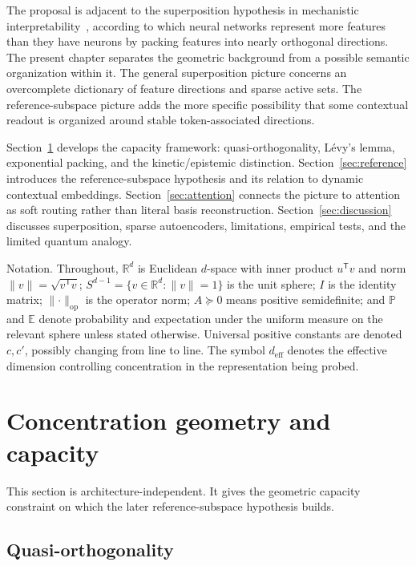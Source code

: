 \documentclass[
  aps,
  reprint,
  superscriptaddress,
  floatfix,
  nofootinbib,
  longbibliography
]{revtex4-2}
\newcommand{\R}{\mathbb{R}}
\newcommand{\E}{\mathbb{E}}
\newcommand{\Prob}{\mathbb{P}}
\newcommand{\Sph}[1]{S^{#1}}
\newcommand{\deff}{d_{\mathrm{eff}}}
\newcommand{\T}{^{\mathsf{T}}}
\newcommand{\opnorm}[1]{\lVert #1 \rVert_{\mathrm{op}}}
\newcommand{\norm}[1]{\lVert #1 \rVert}
\begin{document}
The proposal is adjacent to the superposition hypothesis in mechanistic
interpretability~\cite{elhage2022superposition}, according to which neural networks
represent more features than they have neurons by packing features into
nearly orthogonal directions. The present chapter separates the
geometric background from a possible semantic organization within it.
The general superposition picture concerns an overcomplete dictionary
of feature directions and sparse active sets. The reference-subspace picture adds
the more specific possibility that some contextual readout is organized
around stable token-associated directions.

Section~\ref{sec:concentration} develops the capacity framework:
quasi-orthogonality, L\'evy's lemma, exponential packing, and the
kinetic/epistemic distinction. Section~\ref{sec:reference} introduces the
reference-subspace hypothesis and its relation to dynamic contextual
embeddings. Section~\ref{sec:attention} connects the picture to
attention as soft routing rather than literal basis reconstruction.
Section~\ref{sec:discussion} discusses superposition, sparse
autoencoders, limitations, empirical tests, and the limited quantum
analogy.

{Notation.}
Throughout, $\R^{d}$ is Euclidean $d$-space with inner product $u\T v$
and norm $\norm{v}=\sqrt{v\T v}$; $\Sph{d-1}=\{v\in\R^{d}:\norm{v}=1\}$
is the unit sphere; $I$ is the identity matrix; $\opnorm{\cdot}$ is the
operator norm; $A\succeq0$ means positive semidefinite; and $\Prob$ and
$\E$ denote probability and expectation under the uniform measure on
the relevant sphere unless stated otherwise. Universal positive
constants are denoted $c,c'$, possibly changing from line to line.
The symbol $\deff$ denotes the effective dimension controlling
concentration in the representation being probed.

\section{Concentration geometry and capacity}
\label{sec:concentration}

This section is architecture-independent. It gives the geometric
capacity constraint on which the later reference-subspace hypothesis builds.

\subsection{Quasi-orthogonality}
\label{sec:quasiortho}
\end{document}
